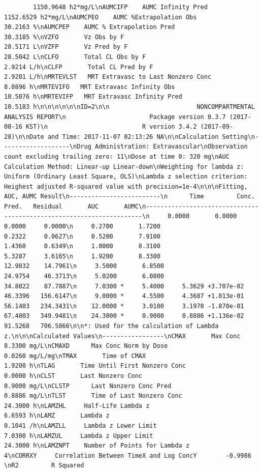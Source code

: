 \documentclass[12pt,]{krantz}
\theoremstyle{definition}
\theoremstyle{definition}
\theoremstyle{definition}
\theoremstyle{remark}
\begin{document}
\begin{verbatim}
        1150.9648 h2*mg/L\nAUMCIFP    AUMC Infinity Pred                           1152.6529 h2*mg/L\nAUMCPEO    AUMC %Extrapolation Obs                        30.2163 %\nAUMCPEP    AUMC % Extrapolation Pred                      30.3185 %\nVZFO       Vz Obs by F                                    28.5171 L\nVZFP       Vz Pred by F                                   28.5042 L\nCLFO       Total CL Obs by F                               2.9214 L/h\nCLFP       Total CL Pred by F                              2.9201 L/h\nMRTEVLST   MRT Extravasc to Last Nonzero Conc              8.0896 h\nMRTEVIFO   MRT Extravasc Infinity Obs                     10.5076 h\nMRTEVIFP   MRT Extravasc Infinity Pred                    10.5183 h\n\n\n\n\n\nID=2\n\n                        NONCOMPARTMENTAL ANALYSIS REPORT\n                       Package version 0.3.7 (2017-08-16 KST)\n                          R version 3.4.2 (2017-09-28)\n\nDate and Time: 2017-11-07 02:13:26 NA\n\nCalculation Setting\n-------------------\nDrug Administration: Extravascular\nObservation count excluding trailing zero: 11\nDose at time 0: 320 mg\nAUC Calculation Method: Linear-up Linear-down\nWeighting for lambda z: Uniform (Ordinary Least Square, OLS)\nLambda z selection criterion: Heighest adjusted R-squared value with precision=1e-4\n\n\nFitting, AUC, AUMC Result\n-------------------------\n      Time         Conc.      Pred.   Residual       AUC       AUMC\n---------------------------------------------------------------------\n     0.0000       0.0000                           0.0000     0.0000\n     0.2700       1.7200                           0.2322     0.0627\n     0.5200       7.9100                           1.4360     0.6349\n     1.0000       8.3100                           5.3287     3.6165\n     1.9200       8.3300                          12.9832    14.7961\n     3.5000       6.8500                          24.9754    46.3713\n     5.0200       6.0800                          34.8022    87.7887\n     7.0300 *     5.4000     5.3629 +3.707e-02    46.3396   156.6147\n     9.0000 *     4.5500     4.3687 +1.813e-01    56.1403   234.3431\n    12.0000 *     3.0100     3.1970 -1.870e-01    67.4803   349.9481\n    24.3000 *     0.9000     0.8886 +1.136e-02    91.5268   706.5866\n\n*: Used for the calculation of Lambda z.\n\n\nCalculated Values\n-----------------\nCMAX       Max Conc                                        8.3300 mg/L\nCMAXD      Max Conc Norm by Dose                           0.0260 mg/L/mg\nTMAX       Time of CMAX                                    1.9200 h\nTLAG       Time Until First Nonzero Conc                   0.0000 h\nCLST       Last Nonzero Conc                               0.9000 mg/L\nCLSTP      Last Nonzero Conc Pred                          0.8886 mg/L\nTLST       Time of Last Nonzero Conc                      24.3000 h\nLAMZHL     Half-Life Lambda z                              6.6593 h\nLAMZ       Lambda z                                        0.1041 /h\nLAMZLL     Lambda z Lower Limit                            7.0300 h\nLAMZUL     Lambda z Upper Limit                           24.3000 h\nLAMZNPT    Number of Points for Lambda z                   4\nCORRXY     Correlation Between TimeX and Log ConcY        -0.9986 \nR2         R Squared                                
\end{verbatim}
\end{document}
